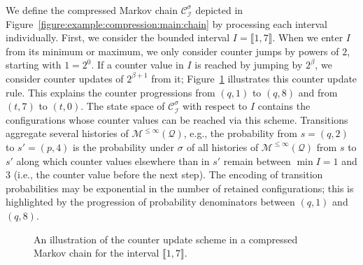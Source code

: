 \documentclass[a4paper,UKenglish,cleveref,autoref,thm-restate,colorlinks]{lipics-v2021}
\newcommand{\integerInterval}[1]{\llbracket{}#1\rrbracket{}}
\newcommand{\mdp}{\mathcal{M}}
\newcommand{\ocmdp}{\mathcal{Q}}
\newcommand{\ocmdpFin}[2]{\mdp^{\leq #2}(#1)}
\newcommand{\ocState}{q}
\newcommand{\ocStateB}{p}
\newcommand{\ocStateC}{t}
\newcommand{\ocConfig}{s}
\newcommand{\mchain}{\mathcal{C}}
\newcommand{\intPart}{\mathcal{I}}
\newcommand{\interval}{I}
\newcommand{\powerMax}{\beta}
\newcommand{\compressChainStrat}[1]{\mchain^{#1}_{\intPart}}
\newcommand{\compressChain}{\compressChainStrat{\strat}}
\newcommand{\stratGeneric}[1]{{\sigma_{#1}}}
\newcommand{\strat}{\stratGeneric{}}
\begin{document}
\begin{example}
  We define the compressed Markov chain $\compressChain$ depicted in Figure~\ref{figure:example:compression:main:chain} by processing each interval individually.
  First, we consider the bounded interval $\interval = \integerInterval{1, 7}$.
  When we enter $\interval$ from its minimum or maximum, we only consider counter jumps by powers of $2$, starting with $1=2^0$.
  If a counter value in $\interval$ is reached by jumping by $2^\powerMax$, we consider counter updates of $2^{\powerMax+1}$ from it; Figure~\ref{figure:mc:counter update scheme} illustrates this counter update rule.
  This explains the counter progressions from $(\ocState, 1)$ to $(\ocState, 8)$ and from $(\ocStateC, 7)$ to $(\ocStateC, 0)$.
  The state space of $\compressChain$ with respect to $\interval$ contains the configurations whose counter values can be reached via this scheme.
  Transitions aggregate several histories of $\ocmdpFin{\ocmdp}{\infty}$, e.g., the probability from $\ocConfig=(\ocState, 2)$ to $\ocConfig' =(\ocStateB, 4)$ is the probability under $\strat$ of all histories of $\ocmdpFin{\ocmdp}{\infty}$ from $\ocConfig$ to $\ocConfig'$ along which counter values elsewhere than in $\ocConfig'$ remain between $\min\interval=1$ and $3$ (i.e., the counter value before the next step).
  The encoding of transition probabilities may be exponential in the number of retained configurations; this is highlighted by the progression of probability denominators between $(\ocState, 1)$ and $(\ocState, 8)$.

  \begin{figure}
  \centering
  \caption{An illustration of the counter update scheme in a compressed Markov chain for the interval $\integerInterval{1, 7}$.}\label{figure:mc:counter update scheme}
\end{figure}


\end{example}
\end{document}
